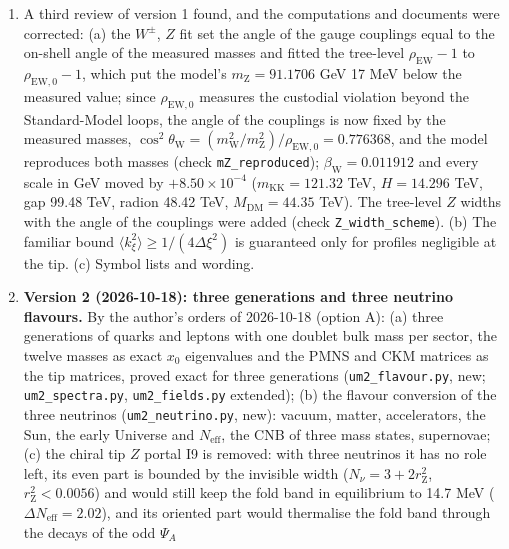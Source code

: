 \documentclass[
  10pt,
]{article}
\begin{document}
\begin{enumerate}
  \(\mathrm{Vol}_7\) (not the proper seven-volume), the occupations
  \(\phi_o\), the tip coupling matrices, and the notation (with a list
  of the symbols with more than one use in each document; version 4
  replaces these lists by one meaning per symbol).
\item
  A third review of version 1 found, and the computations and documents
  were corrected: (a) the \(W^\pm\), \(Z\) fit set the angle of the
  gauge couplings equal to the on-shell angle of the measured masses and
  fitted the tree-level \(\rho_{\mathrm{EW}} - 1\) to
  \(\rho_{\mathrm{EW},0} - 1\), which put the model's
  \(m_{\mathrm{Z}} = 91.1706\) GeV 17 MeV below the measured value;
  since \(\rho_{\mathrm{EW},0}\) measures the custodial violation beyond
  the Standard-Model loops, the angle of the couplings is now fixed by
  the measured masses,
  \(\cos^2\theta_{\mathrm{W}} = (m_{\mathrm{W}}^2/m_{\mathrm{Z}}^2)/\rho_{\mathrm{EW},0} = 0.776368\),
  and the model reproduces both masses (check \texttt{mZ\_reproduced});
  \(\beta_{\mathrm{W}} = 0.011912\) and every scale in GeV moved by
  \(+8.50\times10^{-4}\) (\(m_{\mathrm{KK}} = 121.32\) TeV,
  \(H = 14.296\) TeV, gap 99.48 TeV, radion 48.42 TeV,
  \(M_{\mathrm{DM}} = 44.35\) TeV). The tree-level \(Z\) widths with the
  angle of the couplings were added (check \texttt{Z\_width\_scheme}).
  (b) The familiar bound \(\langle k_\xi^2\rangle \ge 1/(4\Delta\xi^2)\)
  is guaranteed only for profiles negligible at the tip. (c) Symbol
  lists and wording.
\item
  \textbf{Version 2 (2026-10-18): three generations and three neutrino
  flavours.} By the author's orders of 2026-10-18 (option A): (a) three
  generations of quarks and leptons with one doublet bulk mass per
  sector, the twelve masses as exact \(x_0\) eigenvalues and the PMNS
  and CKM matrices as the tip matrices, proved exact for three
  generations (\texttt{um2\_flavour.py}, new; \texttt{um2\_spectra.py},
  \texttt{um2\_fields.py} extended); (b) the flavour conversion of the
  three neutrinos (\texttt{um2\_neutrino.py}, new): vacuum, matter,
  accelerators, the Sun, the early Universe and \(N_{\mathrm{eff}}\),
  the CNB of three mass states, supernovae; (c) the chiral tip \(Z\)
  portal I9 is removed: with three neutrinos it has no role left, its
  even part is bounded by the invisible width
  (\(N_\nu = 3 + 2r_{\mathrm{Z}}^2\), \(r_{\mathrm{Z}}^2 < 0.0056\)) and
  would still keep the fold band in equilibrium to 14.7 MeV
  (\(\Delta N_{\mathrm{eff}} = 2.02\)), and its oriented part would
  thermalise the fold band through the decays of the odd \(\Psi_A\)

\end{enumerate}
\end{document}
